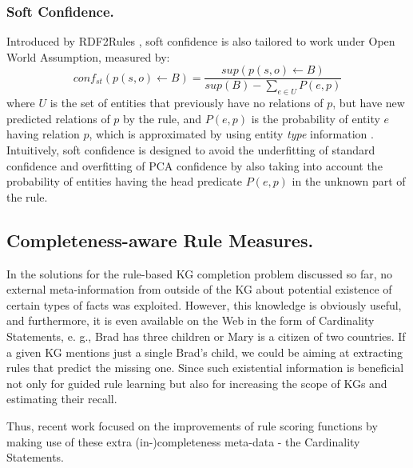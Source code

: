 \subsubsection{Soft Confidence.} Introduced by RDF2Rules \cite{rdf2rules}, soft confidence is also tailored to work under Open World Assumption, measured by:
\[conf_{st}(p(s,o) \leftarrow B) = \frac{sup(p(s,o) \leftarrow B)}{sup(B) - \sum_{e \in U}P(e,p)} \]
where $U$ is the set of entities that previously have no relations of $p$, but have new predicted relations of $p$ by the rule, and $P(e,p)$ is the probability of entity $e$ having relation $p$, which is approximated by using entity \textit{type} information \cite{rdf2rules}. Intuitively, soft confidence is designed to avoid the underfitting of standard confidence and overfitting of PCA confidence by also taking into account the probability of entities having the head predicate $P(e,p)$ in the unknown part of the rule.
\subsection{Completeness-aware Rule Measures.}  
In the solutions for the rule-based KG completion problem discussed so far, no external meta-information from outside of the KG about potential existence of certain types of facts was exploited. However, this knowledge is obviously useful, and furthermore, it is even available on the Web
in the form of Cardinality Statements, e. g., Brad has three children or Mary is a citizen of two countries. If a given KG mentions just a single Brad’s child, we could be aiming at extracting rules that predict the missing
one. Since such existential information is beneficial not only for guided rule learning but also for increasing the scope of KGs and estimating their recall.

Thus, recent work \cite{carl} focused on the improvements of rule scoring functions by making use of these extra (in-)completeness meta-data - the Cardinality Statements.



